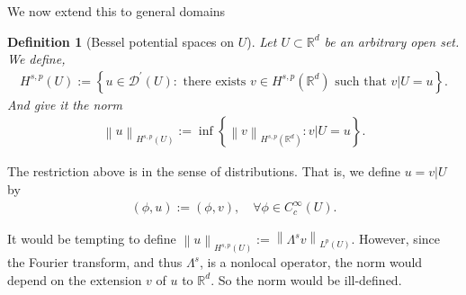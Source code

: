 \documentclass[
    a4paper,
    DIV=14,
    abstract=true,
    numbers=noenddot
]
{scrartcl}
\newtheorem{definition}[theorem]{Definition}
\theoremstyle{definition}
\newcommand{\set}[1]{\left\{#1\right\}}
\renewcommand{\norm}[1]{\left\lVert #1 \right\rVert}\renewcommand{\abs}[1]{\left| #1 \right|}
\newcommand\restr[2]{\left.#1\right|{#2}}
\newcommand{\R}{\mathbb{R}}
\begin{document}
We now extend this to general domains
\begin{definition}[Bessel potential spaces on $U$]\label{bessel potential def U}
  Let $U \subset \R^d$ be an arbitrary open set. We define,
  \begin{align*}
    H^{s,p}(U):=\left\{u \in \mathcal{D}^{\prime}(U): \text{ there exists } v \in H^{s,p}(\R^d) \text{ such that } \restr{v}{U}=u\right\}.
  \end{align*}
  And give it the norm
  \begin{align*}
    \norm{u}_{H^{s,p}(U)}:= \inf \set{\norm{v}_{H^{s,p}(\R^d)}: \restr{v}{U}=u}.
  \end{align*}
\end{definition}
The restriction above is in the sense of distributions. That is, we define $u=\restr{v}{U}$ by
\begin{align*}
  (\phi,u):=(\phi,v), \quad \forall \phi \in C_c^\infty(U).
\end{align*}

It would be tempting to define $\norm{u}_{H^{s,p}(U)}:=\norm{\Lambda^s v}_{L^p(U)}$. However, since the Fourier transform, and thus $\Lambda^s$, is a nonlocal operator, the norm would depend on the extension $v$  of $u$ to $\R^d$. So the norm would be ill-defined.
\end{document}
